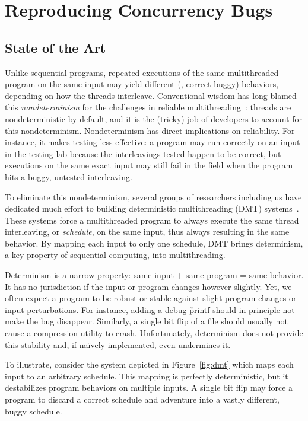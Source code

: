 \chapter{Reproducing Concurrency Bugs} \label{sec:bugs}

\section{State of the Art} \label{sec:bugs-intro}
Unlike sequential programs, repeated executions of the same multithreaded
program on the same input may yield different (\eg, correct \vs buggy)
behaviors, depending on how the threads interleave. Conventional wisdom
has long blamed this \emph{nondeterminism} for the challenges in reliable
multithreading~\cite{lee06}: threads are nondeterministic by default, 
and it is the (tricky) job of developers to account for this nondeterminism.
Nondeterminism has direct implications on reliability.  For instance, it
makes testing less effective: a program may run correctly on an input in
the testing lab because the interleavings tested happen to be correct, but
executions on the same exact input may still fail in the field when the
program hits a buggy, untested interleaving.

To eliminate this nondeterminism, several groups of researchers including
us have dedicated much effort to building deterministic multithreading (DMT)
systems~\cite{dmp:asplos09,coredet:asplos10,kendo:asplos09,grace:oopsla09,dthreads:sosp11,dpj:oopsla09,determinator:cacm}. These systems force a multithreaded program to always execute the same
thread interleaving, or \emph{schedule}, on the same input, thus always
resulting in the same behavior.  By mapping each input to only one
schedule, DMT brings determinism, a key property of sequential computing,
into multithreading.

Determinism is a narrow property: same input + same program = same behavior. It has no
jurisdiction if the input or program changes however slightly.  Yet, we
often expect a program to be robust or stable against slight program
changes or input perturbations.  For instance, adding a debug \v{printf}
should in principle not make the bug
disappear.  Similarly, a single bit flip of a file should usually not
cause a compression utility to crash. Unfortunately, determinism
does not provide this stability and, if na\"{i}vely implemented,
even undermines it.

To illustrate, consider the system depicted in
Figure~\ref{fig:dmt} which maps each input to an arbitrary schedule. This
mapping is perfectly deterministic, but it destabilizes program
behaviors on multiple inputs.  A single bit flip may force a program to
discard a correct schedule and adventure into a vastly different, buggy
schedule.

